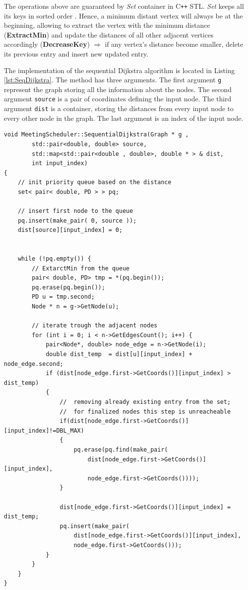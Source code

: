 \documentclass[thesis=M,english]{FITthesis}[2012/10/20]
\begin{document}
The operations above are guaranteed by \textit{Set} container in C\texttt{++} STL. \textit{Set} keeps all its keys in sorted order \cite{STL17}. Hence, a minimum distant vertex will always be at the beginning, allowing to extract the vertex with the minimum distance (\textbf{ExtractMin}) and update the distances of all other adjacent vertices accordingly (\textbf{DecreaseKey}) $\Rightarrow$ if any vertex's distance become smaller, delete its previous entry and insert new updated entry.

The implementation of the sequential Dijkstra algorithm is located in Listing \ref{lst:SeqDijkstra}. The method has three arguments. The first argument \texttt{g} represent the graph storing all the information about the nodes. The second argument \texttt{source} is a pair of coordinates defining the input node. The third argument \texttt{dist} is a container, storing the distances from every input node to every other node in the graph. The last argument is an index of the input node.

\begin{lstlisting}[frame=single, caption={Sequential Dijkstra algorithm}, label={lst:SeqDijkstra}, breaklines=true]
void MeetingScheduler::SequentialDijkstra(Graph * g , 
		std::pair<double, double> source, 
		std::map<std::pair<double , double>, double * > & dist, 
		int input_index)
{
    // init priority queue based on the distance
    set< pair< double, PD > > pq;

    // insert first node to the queue
    pq.insert(make_pair( 0, source ));
    dist[source][input_index] = 0;


    while (!pq.empty()) {
        // ExtarctMin from the queue
        pair< double, PD> tmp = *(pq.begin());
        pq.erase(pq.begin());
        PD u = tmp.second;
        Node * n = g->GetNode(u);

        // iterate trough the adjacent nodes
        for (int i = 0; i < n->GetEdgesCount(); i++) {
            pair<Node*, double> node_edge = n->GetNode(i);
            double dist_temp  = dist[u][input_index] + node_edge.second;
            if (dist[node_edge.first->GetCoords()][input_index] > dist_temp)
            {
                // 	removing already existing entry from the set; 
                //	for finalized nodes this step is unreacheable
                if(dist[node_edge.first->GetCoords()][input_index]!=DBL_MAX)
                {
                    pq.erase(pq.find(make_pair(
                    	dist[node_edge.first->GetCoords()][input_index], 
                    	node_edge.first->GetCoords())));
                }

                dist[node_edge.first->GetCoords()][input_index] = dist_temp;
                pq.insert(make_pair(
                	dist[node_edge.first->GetCoords()][input_index], 
                	node_edge.first->GetCoords()));
            }
        }
    }
}
\end{lstlisting}
\end{document}
